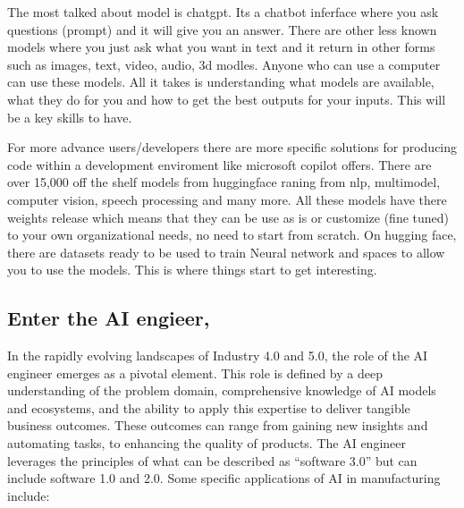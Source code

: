 \documentclass[
  letterpaper,
  DIV=11,
  numbers=noendperiod]{scrartcl}
\begin{document}
The most talked about model is chatgpt. Its a chatbot inferface where
you ask questions (prompt) and it will give you an answer. There are
other less known models where you just ask what you want in text and it
return in other forms such as images, text, video, audio, 3d modles.
Anyone who can use a computer can use these models. All it takes is
understanding what models are available, what they do for you and how to
get the best outputs for your inputs. This will be a key skills to have.

For more advance users/developers there are more specific solutions for
producing code within a development enviroment like microsoft copilot
offers. There are over 15,000 off the shelf models from huggingface
raning from nlp, multimodel, computer vision, speech processing and many
more. All these models have there weights release which means that they
can be use as is or customize (fine tuned) to your own organizational
needs, no need to start from scratch. On hugging face, there are
datasets ready to be used to train Neural network and spaces to allow
you to use the models. This is where things start to get interesting.

\hypertarget{enter-the-ai-engieer}{%
\subsection{Enter the AI engieer,}\label{enter-the-ai-engieer}}

In the rapidly evolving landscapes of Industry 4.0 and 5.0, the role of
the AI engineer emerges as a pivotal element. This role is defined by a
deep understanding of the problem domain, comprehensive knowledge of AI
models and ecosystems, and the ability to apply this expertise to
deliver tangible business outcomes. These outcomes can range from
gaining new insights and automating tasks, to enhancing the quality of
products. The AI engineer leverages the principles of what can be
described as ``software 3.0'' but can include software 1.0 and 2.0. Some
specific applications of AI in manufacturing include:
\end{document}
